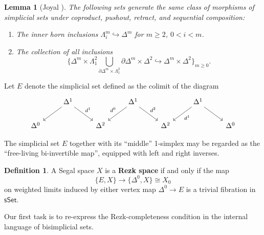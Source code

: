 \documentclass{amsart}
\theoremstyle{plain}
\newtheorem{lem}[thm]{Lemma}
\theoremstyle{definition}
\newtheorem{defn}[thm]{Definition}
\theoremstyle{remark}
\numberwithin{equation}{section}
\newcommand{\sSet}{\mathsf{sSet}}
\begin{document}
\begin{lem}[{Joyal \cite[2.3.2.1]{HTT}}]\label{lem:2.3.2.1} The following sets generate the same class of morphisms of simplicial sets under coproduct, pushout, retract, and sequential composition:
\begin{enumerate}
\item The inner horn inclusions $\Lambda^m_i \hookrightarrow\Delta^m$ for $m \geq 2$, $0< i < m$.
\item The collection of all inclusions
\[ \{ \Delta^m \times \Lambda^2_1 \bigcup\limits_{\partial\Delta^m\times \Lambda^2_1} \partial\Delta^m \times\Delta^2 \hookrightarrow \Delta^m \times \Delta^2\}_{m \geq 0}.\]
\end{enumerate}
\end{lem}

Let $E$ denote the simplicial set defined as the colimit of the diagram
\[
\begin{tikzcd} & \Delta^1 \arrow[dl] \arrow[dr, "d^1"] & & \Delta^1 \arrow[dl, "d^0"'] \arrow[dr, "d^2"]  & & \Delta^1 \arrow[dl, "d^1"] \arrow[dr] \\ \Delta^0 & & \Delta^2 & & \Delta^2 & & \Delta^0
\end{tikzcd}
\]

The simplicial set $E$ together with its ``middle'' 1-simplex may be regarded as the ``free-living bi-invertible map'', equipped with left and right inverses.

\begin{defn}\label{defn:rezk-space} A Segal space $X$ is a \textbf{Rezk space} if and only if the map
\[ \{E,X\} \to \{\Delta^0,X\}\cong X_0\] on weighted limits induced by either vertex map $\Delta^0 \to E$ is a trivial fibration in $\sSet$.
\end{defn}

Our first task is to re-express the Rezk-completeness condition in the internal language of bisimplicial sets.
\end{document}
